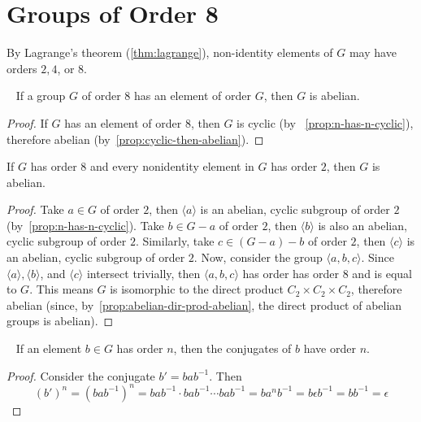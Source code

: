 \section{Groups of Order 8}

By Lagrange's theorem (\ref{thm:lagrange}),
non-identity elements of $G$ may have orders $2, 4$, or $8$.
\begin{corollary}~\label{group-order-8-has-8-abelian}
  If a group $G$ of order $8$ has an element of order $G$,
  then $G$ is abelian.

  \begin{proof}
    If $G$ has an element of order $8$, then $G$ is cyclic
    (by ~\ref{prop:n-has-n-cyclic}), therefore abelian (by~\ref{prop:cyclic-then-abelian}).
  \end{proof}
\end{corollary}

\begin{corollary}
  If $G$ has order $8$ and every nonidentity element in $G$
  has order $2$, then $G$ is abelian.
  
  \begin{proof}
    Take $a \in G$ of order $2$,
    then $\langle a \rangle$ is an abelian, cyclic subgroup of order $2$
    (by~\ref{prop:n-has-n-cyclic}).
    Take $b \in G - a$ of order $2$,
    then $\langle b \rangle$ is also an abelian, cyclic subgroup of order $2$.
    Similarly, take $c \in (G - a) - b$ of order $2$,
    then $\langle c \rangle$ is an abelian, cyclic subgroup of order $2$.
    Now, consider the group $\langle a, b, c \rangle$.
    Since $\langle a \rangle, \langle b \rangle$, and $\langle c \rangle$ intersect
    trivially, then $\langle a, b, c\rangle$ has order has order $8$ and is equal to $G$.
    This means $G$ is isomorphic to the direct product $C_2 \times C_2 \times C_2$,
    therefore abelian (since, by~\ref{prop:abelian-dir-prod-abelian},
    the direct product of abelian groups is abelian).
  \end{proof}
\end{corollary}

\begin{proposition}~\label{prop:order-preserved-under-conjugation}
  If an element $b \in G$ has order $n$,
  then the conjugates of $b$ have order $n$.

  \begin{proof}
    Consider the conjugate $b' = bab^{-1}$.
    Then
    \[ 
      (b')^n = {(bab^{-1})}^n = bab^{-1} \cdot bab^{-1} \cdots bab^{-1}
       = ba^nb^{-1} = b\epsilon b^{-1} = bb^{-1} = \epsilon \]
  \end{proof}
\end{proposition}

